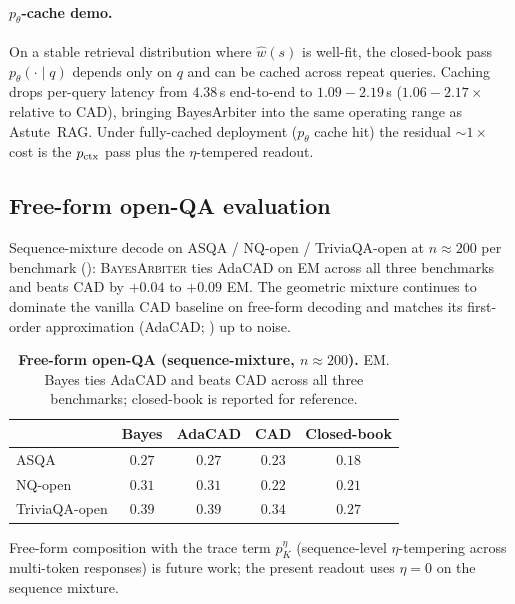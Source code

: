\paragraph{$p_\theta$-cache demo.} On a stable retrieval distribution
where $\hat w(s)$ is well-fit, the closed-book pass $p_\theta(\cdot\!\mid\!q)$
depends only on $q$ and can be cached across repeat queries. Caching
drops per-query latency from $4.38$\,s end-to-end to $1.09\!-\!2.19$\,s
($1.06\!-\!2.17\!\times$ relative to CAD), bringing BayesArbiter into
the same operating range as Astute~RAG. Under fully-cached deployment
($p_\theta$ cache hit) the residual $\sim\!1\times$ cost is the
$p_{\mathrm{ctx}}$ pass plus the $\eta$-tempered readout.

\subsection{Free-form open-QA evaluation}
\label{app:freeform-openqa}

Sequence-mixture decode on ASQA / NQ-open / TriviaQA-open at
$n\!\approx\!200$ per benchmark ():
\textsc{BayesArbiter} ties AdaCAD on EM across all three benchmarks and beats CAD
by $+0.04$ to $+0.09$ EM. The geometric mixture continues to
dominate the vanilla CAD baseline on free-form decoding and
matches its first-order approximation (AdaCAD;
) up to noise.

\begin{table}[H]
\centering\small
\caption{\textbf{Free-form open-QA (sequence-mixture,
$n\!\approx\!200$).}  EM. Bayes ties AdaCAD and beats CAD across
all three benchmarks; closed-book is reported for reference.}
\label{tab:freeform-openqa-200}
\label{tab:freeform-openqa}
\begin{tabular}{lcccc}
\toprule
& \textbf{Bayes} & \textbf{AdaCAD} & \textbf{CAD} & \textbf{Closed-book}\\
\midrule
ASQA           & $\mathbf{0.27}$ & $\mathbf{0.27}$ & $0.23$ & $0.18$\\
NQ-open        & $\mathbf{0.31}$ & $\mathbf{0.31}$ & $0.22$ & $0.21$\\
TriviaQA-open  & $\mathbf{0.39}$ & $\mathbf{0.39}$ & $0.34$ & $0.27$\\
\bottomrule
\end{tabular}
\end{table}

Free-form composition with the trace term $p_K^\eta$ (sequence-level
$\eta$-tempering across multi-token responses) is future work; the
present readout uses $\eta\!=\!0$ on the sequence mixture.


